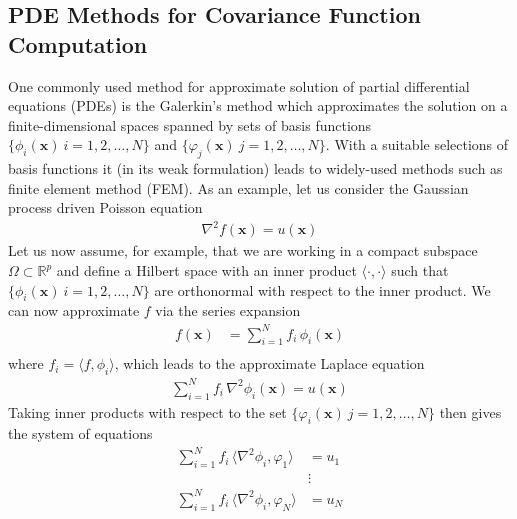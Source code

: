 \documentclass[journal]{IEEEtran}
\begin{document}
\subsection{PDE Methods for Covariance Function Computation}
%
One commonly used method for approximate solution of partial differential equations (PDEs) is the Galerkin's method which approximates the solution on a finite-dimensional spaces spanned by sets of basis functions $\{ \phi_i(\mathbf{x})~i=1,2,\ldots,N \}$ and $\{ \varphi_j(\mathbf{x})~j=1,2,\ldots,N \}$. With a suitable selections of basis functions it (in its weak formulation) leads to widely-used methods such as finite element method (FEM). As an example, let us consider the Gaussian process driven Poisson equation
%
\begin{equation}
\begin{split}
  \nabla^2 f(\mathbf{x}) = u(\mathbf{x})
\end{split}
\end{equation}
%
Let us now assume, for example, that we are working in a compact subspace $\Omega \subset \mathbb{R}^p$ and define a Hilbert space with an inner product $\langle \cdot, \cdot \rangle$ such that $\{ \phi_i(\mathbf{x})~i=1,2,\ldots,N \}$ are orthonormal with respect to the inner product. We can now approximate $f$ via the series expansion
%
\begin{equation}
\begin{split}
   f(\mathbf{x}) &= \sum_{i=1}^N f_i \, \phi_i(\mathbf{x}) \\
\end{split}
\end{equation}
%
where $f_i = \langle f, \phi_i \rangle$, which leads to the approximate Laplace equation
%
\begin{equation}
\begin{split}
  \sum_{i=1}^N f_i \, \nabla^2 \phi_i(\mathbf{x}) = u(\mathbf{x})
\end{split}
\end{equation}
%
Taking inner products with respect to the set $\{ \varphi_i(\mathbf{x})~j=1,2,\ldots,N \}$ then gives the system of equations
%
\begin{equation}
\begin{split}
  \sum_{i=1}^N f_i \, \langle \nabla^2 \phi_i, \varphi_1 \rangle &= u_1 \\
  &\vdots \\
  \sum_{i=1}^N f_i \, \langle \nabla^2 \phi_i, \varphi_N \rangle &= u_N \\
\end{split}
\end{equation}
\end{document}
